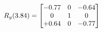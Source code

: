 \documentclass[preview]{standalone}
\begin{document}
\begin{align*}
\special{dvisvgm:raw <g id='unique000'>}R_{y}(3.84) = \begin{bmatrix}-0.77 & 0 & -0.64 \\0 & 1 & 0 \\+0.64 & 0 & -0.77\end{bmatrix}\special{dvisvgm:raw </g>}
\end{align*}
\end{document}
